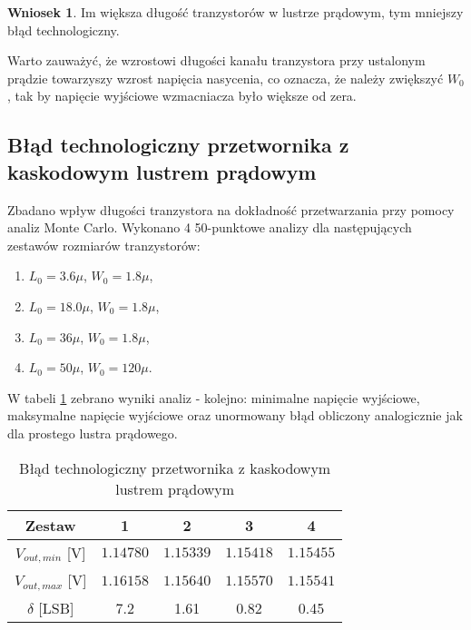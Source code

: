 \documentclass[10pt,a4paper,twoside]{report}
\theoremstyle{definition}
\theoremstyle{definition}
\theoremstyle{definition}
\theoremstyle{definition}
\theoremstyle{definition}
\newtheorem{wniosek}{Wniosek}[section]
\begin{document}
{{{{	\begin{wniosek}{Im większa długość tranzystorów w lustrze prądowym, tym mniejszy błąd technologiczny.}
	\end{wniosek}

	Warto zauważyć, że wzrostowi długości kanału tranzystora przy ustalonym prądzie towarzyszy wzrost napięcia nasycenia, co oznacza, że należy zwiększyć $W_0$, tak by napięcie wyjściowe wzmacniacza było większe od zera.
	
	\subsection{Błąd technologiczny przetwornika z kaskodowym lustrem prądowym}
	{	Zbadano wpływ długości tranzystora na dokładność przetwarzania przy pomocy analiz Monte Carlo. Wykonano 4 50-punktowe analizy dla następujących zestawów rozmiarów tranzystorów:
	\begin{enumerate}
		\item $L_0 = 3.6\mu$, $W_0 = 1.8\mu$,
		\item $L_0 = 18.0\mu$, $W_0 = 1.8\mu$,
		\item $L_0 = 36\mu$, $W_0 = 1.8\mu$,
		\item $L_0 = 50\mu$, $W_0 = 120\mu$.
	\end{enumerate}
	W tabeli \ref{tab:delta_cascode} zebrano wyniki analiz - kolejno: minimalne napięcie wyjściowe, maksymalne napięcie wyjściowe oraz unormowany błąd obliczony analogicznie jak dla prostego lustra prądowego.
	\begin{table}[!ht]
	\begin{center}
		\begin{tabular}{|c|c|c|c|c|}
			\hline 
			Zestaw & 1 & 2 & 3  & 4\\ 
			\hline 
			$V_{out,min}$ [V] & $1.14780$ & $1.15339$ & $1.15418$ & $1.15455$ \\ 
			\hline
			$V_{out,max}$ [V] & $1.16158$ & $1.15640$ & $1.15570$ & $1.15541$\\ 
			\hline 
			$\delta$ [LSB]  & 7.2 & 1.61 & 0.82 & 0.45\\
			\hline
		\end{tabular} 
	\caption{Błąd technologiczny przetwornika z kaskodowym lustrem prądowym}
	\label{tab:delta_cascode}
	\end{center}
	\end{table}

}}}}}
\end{document}
